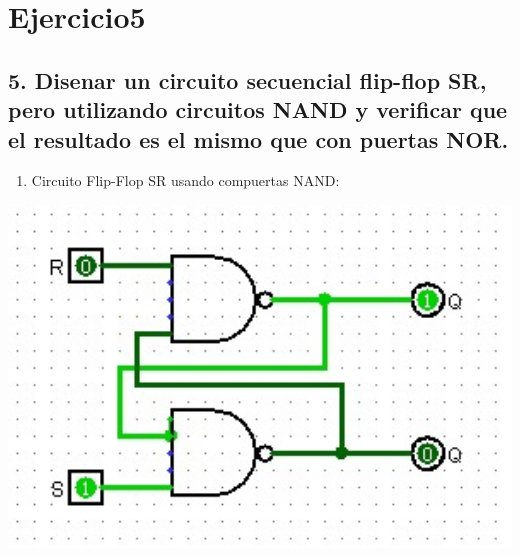 \chapter*{Ejercicio5}
\section*{5. Disenar un circuito secuencial flip-flop SR, pero utilizando circuitos NAND y
verificar que el resultado es el mismo que con puertas NOR.}

\begin{enumerate}
    \item 
Circuito Flip-Flop SR usando compuertas NAND:
\end{enumerate}

\begin{center}
    \includegraphics[width=1\textwidth]{recursos/Ejercicio5.png}
\end{center}


